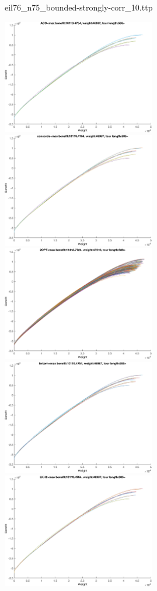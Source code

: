 \documentclass{article}
\begin{document}
\newpage
eil76\_n75\_bounded-strongly-corr\_10.ttp

\noindent
\includegraphics[width=0.5\textwidth]{eil76figs/eil76_n75_bounded-strongly-corr_10.ttp.aco.txt.eps}
\includegraphics[width=0.5\textwidth]{eil76figs/eil76_n75_bounded-strongly-corr_10.ttp.con.txt.eps}
\includegraphics[width=0.5\textwidth]{eil76figs/eil76_n75_bounded-strongly-corr_10.ttp.inv.txt.eps}
\includegraphics[width=0.5\textwidth]{eil76figs/eil76_n75_bounded-strongly-corr_10.ttp.lkh.txt.eps}
\includegraphics[width=0.5\textwidth]{eil76figs/eil76_n75_bounded-strongly-corr_10.ttp.lkh2.txt.eps}
\end{document}
